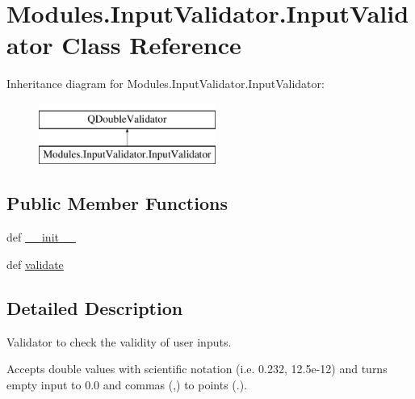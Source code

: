 \hypertarget{classModules_1_1InputValidator_1_1InputValidator}{\section{Modules.\-Input\-Validator.\-Input\-Validator Class Reference}
\label{classModules_1_1InputValidator_1_1InputValidator}
}
Inheritance diagram for Modules.\-Input\-Validator.\-Input\-Validator\-:\begin{figure}[H]
\begin{center}
\leavevmode
\includegraphics[height=2.000000cm]{classModules_1_1InputValidator_1_1InputValidator}
\end{center}
\end{figure}
\subsection*{Public Member Functions}
\begin{DoxyCompactItemize}
\item 
def \hyperlink{classModules_1_1InputValidator_1_1InputValidator_afd271f39a1c348c4497aafc67bab3b6f}{\-\_\-\-\_\-init\-\_\-\-\_\-}
\item 
def \hyperlink{classModules_1_1InputValidator_1_1InputValidator_ad5eeec6eb635dd74d8a892221915f065}{validate}
\end{DoxyCompactItemize}


\subsection{Detailed Description}
\begin{DoxyVerb}Validator to check the validity of user inputs.

Accepts double values with scientific notation (i.e. 0.232, 12.5e-12) and turns 
empty input to 0.0 and commas (,) to points (.).
\end{DoxyVerb}
 

